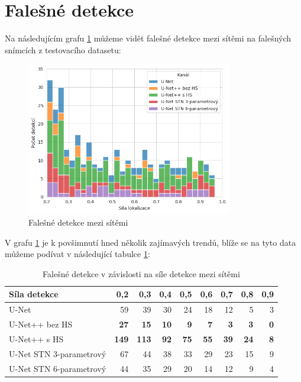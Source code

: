 \section{Falešné detekce}
\label{sec:Chapter63}

Na následujícím grafu \ref{fig:nets_false_detections} můžeme vidět falešné detekce mezi sítěmi na falešných snímcích z testovacího datasetu:

\begin{figure}[H]
\centering
\includegraphics[width=0.8\textwidth,keepaspectratio]{Figures/plots/recall_graph_a.png}
\caption[Falešné detekce mezi sítěmi]{Falešné detekce mezi sítěmi}
\label{fig:nets_false_detections}
\end{figure}

V grafu \ref{fig:nets_false_detections} je k povšimnutí hned několik zajímavých trendů, blíže se na tyto data můžeme podívat v následující tabulce \ref{tab:false_detections}:

\begin{table}[H]
    \centering
    \begin{tabular}{lrrrrrrrr}
    \toprule
    Síla detekce & 0,2 & 0,3 & 0,4 & 0,5 & 0,6 & 0,7 & 0,8 & 0,9 \\
    \midrule
    U-Net & 59 & 39 & 30 & 24 & 18 & 12 & 5 & 3 \\
    U-Net++ bez HS & \textbf{27} & \textbf{15} & \textbf{10} & \textbf{9} & \textbf{7} & \textbf{3} & \textbf{3} & \textbf{0} \\
    U-Net++ s HS & \textbf{149} & \textbf{113} & \textbf{92} & \textbf{75} & \textbf{55} & \textbf{39} & \textbf{24} & \textbf{8} \\
    U-Net STN 3-parametrový & 67 & 44 & 38 & 33 & 29 & 23 & 15 & 9 \\
    U-Net STN 6-parametrový & 44 & 35 & 29 & 20 & 14 & 12 & 9 & 4 \\
    \bottomrule
    \end{tabular}
    \caption[Falešné detekce v závislosti na síle detekce]{Falešné detekce v závislosti na síle detekce mezi sítěmi}
    \label{tab:false_detections}
\end{table}

